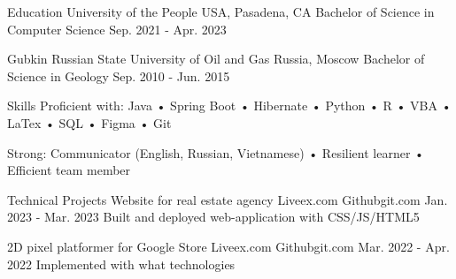 




  

\begin{resumesection}{Education}
	\university
		{University of the People}
		{USA, Pasadena, CA}
		{Bachelor of Science in Computer Science}
		{Sep. 2021 - Apr. 2023}
	
	\university
		{Gubkin Russian State University of Oil and Gas}
		{Russia, Moscow}
		{Bachelor of Science in Geology}
		{Sep. 2010 - Jun. 2015}
\end{resumesection}

\begin{resumesection}{Skills}
	    {Proficient with:}
	    {Java • Spring Boot • Hibernate • Python • R • VBA • LaTex • SQL • Figma • Git}
	
	    {Strong:}
	    {Communicator (English, Russian, Vietnamese) • Resilient learner • Efficient team member}
\end{resumesection}

\begin{resumesection}{Technical Projects}
	\projectinfo
	{Website for real estate agency}
	{Live}{ex.com}
	{Github}{git.com}
	{Jan. 2023 - Mar. 2023}
	{Built and deployed web-application with CSS/JS/HTML5}	
	    
	\projectinfo
	{2D pixel platformer for Google Store}
	{Live}{ex.com}
	{Github}{git.com}
	{Mar. 2022 - Apr. 2022}
	{Implemented with what technologies}
\end{resumesection}

